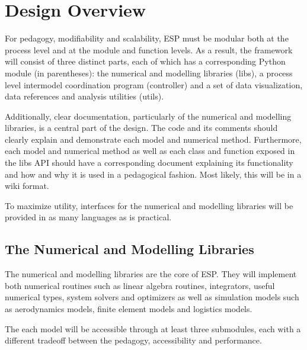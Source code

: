 \documentclass{article}
\begin{document}
\section{Design Overview}

For pedagogy, modifiability and scalability, ESP must be modular both at the process level and at the module and function levels. As a result, the framework will consist of three distinct parts, each of which has a corresponding Python module (in parentheses): the numerical and modelling libraries (libs), a process level intermodel  coordination program (controller) and a set of data visualization, data references and analysis utilities (utils). 

Additionally, clear documentation, particularly of the numerical and modelling libraries, is a central part of the design. The code and its comments should clearly explain and demonstrate each model and numerical method. Furthermore, each model and numerical method as well as each class and function exposed in the libs API should have a corresponding document explaining its functionality and how and why it is used in a pedagogical fashion. Most likely, this will be in a wiki format.

To maximize utility, interfaces for the numerical and modelling libraries will be provided in as many languages as is practical.

\subsection{The Numerical and Modelling Libraries}

The numerical and modelling libraries are the core of ESP. They will implement both numerical routines such as linear algebra routines, integrators, useful numerical types, system solvers and optimizers as well as simulation models such as aerodynamics models, finite element models and logistics models.

The each model will be accessible through at least three submodules, each with a different tradeoff between the pedagogy, accessibility and performance.
\end{document}

